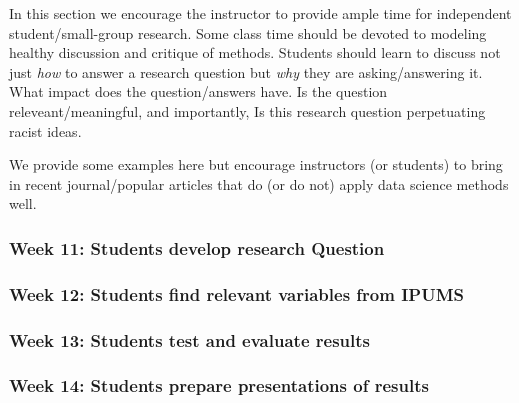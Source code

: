 \documentclass[
]{book}
\begin{document}
In this section we encourage the instructor to provide ample time for independent student/small-group research. Some class time should be devoted to modeling healthy discussion and critique of methods. Students should learn to discuss not just \emph{how} to answer a research question but \emph{why} they are asking/answering it. What impact does the question/answers have. Is the question releveant/meaningful, and importantly, Is this research question perpetuating racist ideas.

We provide some examples here but encourage instructors (or students) to bring in recent journal/popular articles that do (or do not) apply data science methods well.

\hypertarget{week-11-students-develop-research-question}{%
\subsubsection*{Week 11: Students develop research Question}\label{week-11-students-develop-research-question}}

\hypertarget{week-12-students-find-relevant-variables-from-ipums}{%
\subsubsection*{Week 12: Students find relevant variables from IPUMS}\label{week-12-students-find-relevant-variables-from-ipums}}

\hypertarget{week-13-students-test-and-evaluate-results}{%
\subsubsection*{Week 13: Students test and evaluate results}\label{week-13-students-test-and-evaluate-results}}

\hypertarget{week-14-students-prepare-presentations-of-results}{%
\subsubsection*{Week 14: Students prepare presentations of results}\label{week-14-students-prepare-presentations-of-results}}
\end{document}
